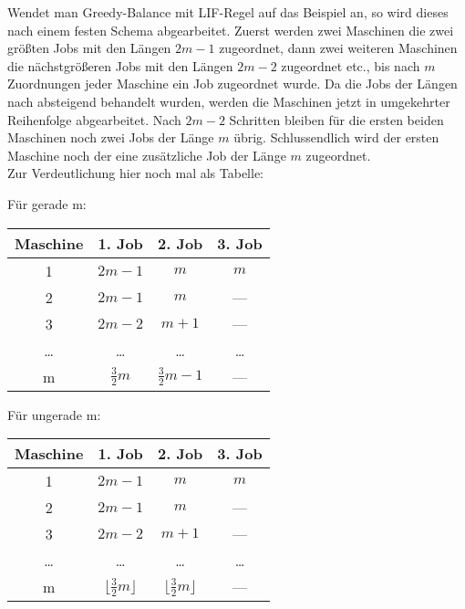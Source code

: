 \documentclass[a4paper]{article}
\begin{document}
	Wendet man Greedy-Balance mit LIF-Regel auf das Beispiel an, so wird dieses nach einem festen Schema abgearbeitet. Zuerst werden zwei Maschinen die zwei größten Jobs mit den Längen $2m -1$ zugeordnet, dann zwei weiteren Maschinen die nächstgrößeren Jobs mit den Längen $2m - 2$ zugeordnet etc., bis nach $m$ Zuordnungen jeder Maschine ein Job zugeordnet wurde. Da die Jobs der Längen nach absteigend behandelt wurden, werden die Maschinen jetzt in umgekehrter Reihenfolge abgearbeitet. Nach $2m - 2$ Schritten bleiben für die ersten beiden Maschinen noch zwei Jobs der Länge $m$ übrig. Schlussendlich wird der ersten Maschine noch der eine zusätzliche Job der Länge $m$ zugeordnet. \\
	Zur Verdeutlichung hier noch mal als Tabelle:
	\begin{multicols}{2}
	Für gerade m: \n
\begin{tabular}{|c||c|c|c|} \hline
Maschine	&	1. Job 	&	2. Job	&	3. Job	\\ \hline \hline
1			&	$2m-1$	&	$m$		&	$m$		\\ \hline
2			&	$2m-1$	&	$m$		&	---		\\ \hline
3			&	$2m-2$	&	$m+1$	&	---		\\ \hline
\dots		&	\dots	&	\dots	&	\dots	\\ \hline
m			&	$\frac{3}{2}m$ 	&	$\frac{3}{2}m-1$ 	&	---	\\ \hline
\end{tabular}

Für ungerade m: \n
	\begin{tabular}{|c||c|c|c|} \hline
Maschine	&	1. Job 	&	2. Job	&	3. Job	\\ \hline \hline
1			&	$2m-1$	&	$m$		&	$m$		\\ \hline
2			&	$2m-1$	&	$m$		&	---		\\ \hline
3			&	$2m-2$	&	$m+1$	&	---		\\ \hline
\dots		&	\dots	&	\dots	&	\dots	\\ \hline
m			&	$\lfloor \frac{3}{2}m \rfloor$	&	$\lfloor \frac{3}{2}m \rfloor$	&	---	\\ \hline
\end{tabular}
	\end{multicols}
\end{document}
